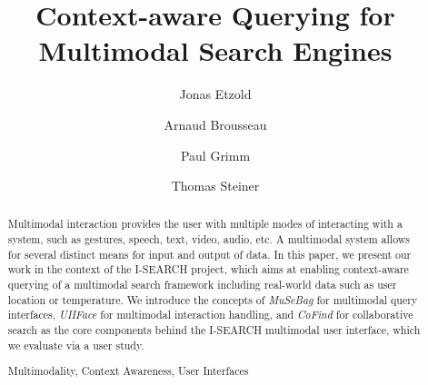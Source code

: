 \documentclass[runningheads,a4paper]{llncs} \usepackage[utf8]{inputenc}
\newcommand{\keywords}[1]{\par\addvspace\baselineskip
\noindent\keywordname\enspace\ignorespaces#1}
\begin{document}
\mainmatter  %

\title{Context-aware Querying for\\ Multimodal Search Engines}


\author{Jonas Etzold \and Arnaud Brousseau \and Paul Grimm \and Thomas Steiner}



\maketitle

\begin{abstract}
Multimodal interaction provides the user with multiple mo\-des of interacting with
a system, such as gestures, speech, text, video, audio, etc. A multimodal system allows for several distinct means for input and output of data. In this paper, we present our work in the context of the \mbox{I-SEARCH} project, which aims at enabling context-aware querying of a multimodal search framework including real-world data such as user location or temperature. We introduce the concepts of \emph{MuSeBag} for multimodal query interfaces, \emph{UIIFace} for multimodal interaction handling, and \emph{CoFind} for collaborative search as the core components behind the \mbox{I-SEARCH} multimodal user interface, which we evaluate via a user study.

\keywords{Multimodality, Context Awareness, User Interfaces}
\end{abstract}
\end{document}
